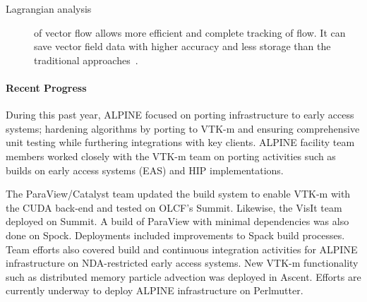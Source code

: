 \begin{description}
	\item [Lagrangian analysis] of vector flow allows more efficient and complete tracking of flow.  It can save vector field data with higher accuracy and less storage than the traditional approaches~\cite{alpine:Sane:EGPGV18,alpine:Sane:EGPGV19,alpine:Binyahib:LDAV19}.
\end{description}


\paragraph{Recent Progress}

During this past year, ALPINE focused on porting infrastructure to early access systems; hardening algorithms by porting to VTK-m and ensuring comprehensive unit testing while furthering integrations with key clients.  ALPINE facility team members worked closely with the VTK-m team on porting activities such as builds on early access systems (EAS) and  HIP implementations. 

The ParaView/Catalyst team updated the build system to enable VTK-m with the CUDA back-end and tested on OLCF's Summit.  Likewise, the VisIt team deployed on Summit.  A  build of ParaView with minimal dependencies was also done on Spock.  Deployments included improvements to Spack build processes.   Team efforts also covered build and continuous integration activities for ALPINE infrastructure on NDA-restricted early access systems.   New VTK-m functionality such as distributed memory particle advection was deployed in Ascent.   Efforts are currently underway to deploy ALPINE infrastructure on Perlmutter.   

